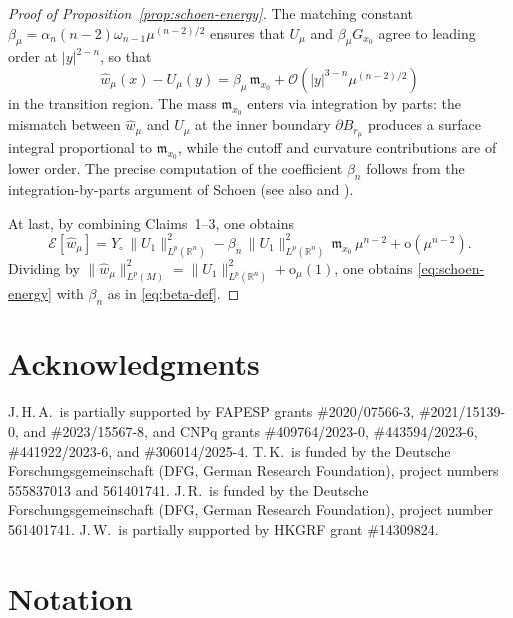 \documentclass[reqno,11pt]{amsart}
\numberwithin{equation}{section}
\theoremstyle{definition}
\theoremstyle{remark}
\newcommand{\R}{\mathbb{R}}
\begin{document}
\begin{proof}[Proof of Proposition~\ref{prop:schoen-energy}]
\smallskip
{} The matching constant $\beta_\mu = \alpha_n(n-2)\omega_{n-1}\mu^{(n-2)/2}$ ensures that $U_\mu$ and $\beta_\mu G_{x_0}$ agree to leading order at $|y|^{2-n}$, so that
\[
\hat{w}_\mu(x) - U_\mu(y) = \beta_\mu\, \mathfrak{m}_{x_0} + \mathcal{O}(|y|^{3-n}\mu^{(n-2)/2})
\]
in the transition region. The mass $\mathfrak{m}_{x_0}$ enters via integration by parts: the mismatch between $\hat{w}_\mu$ and $U_\mu$ at the inner boundary $\partial B_{r_\mu}$ produces a surface integral proportional to $\mathfrak{m}_{x_0}$, while the cutoff and curvature contributions are of lower order. The precise computation of the coefficient $\beta_n$ follows from the integration-by-parts argument of Schoen \cite{Sch1} (see also \cite{Schoen1989} and \cite[Proposition~7.1]{LP}).

\medskip
At last, by combining Claims~1--3, one obtains
\[
\mathcal{E}[\hat{w}_\mu] = Y_\circ\, \|U_1\|_{L^p(\R^n)}^2 - \beta_n\, \|U_1\|_{L^p(\R^n)}^2\, \mathfrak{m}_{x_0}\, \mu^{n-2} + \mathrm{o}(\mu^{n-2}).
\]
Dividing by $\|\hat{w}_\mu\|_{L^p(M)}^2 = \|U_1\|_{L^p(\R^n)}^2 + \mathrm{o}_\mu(1)$, one obtains \eqref{eq:schoen-energy} with $\beta_n$ as in \eqref{eq:beta-def}.
\end{proof}


\section*{Acknowledgments}
J.\,H.\,A.\ is partially supported by FAPESP grants \#2020/07566-3, \#2021/15139-0, and \#2023/15567-8, and CNPq grants \#409764/2023-0, \#443594/2023-6, \#441922/2023-6, and \#306014/2025-4.
T.\,K.\ is funded by the Deutsche Forschungsgemeinschaft (DFG, German Research Foundation), project numbers 555837013 and 561401741.
J.\,R.\ is funded by the Deutsche Forschungsgemeinschaft (DFG, German Research Foundation), project number 561401741.
J.\,W.\ is partially supported by HKGRF grant \#14309824.

\section*{Notation}
\end{document}
